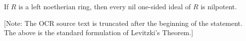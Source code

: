 If $R$ is a left noetherian ring, then every nil one-sided ideal of $R$ is nilpotent.

[Note: The OCR source text is truncated after the beginning of the statement. The above is the standard formulation of Levitzki's Theorem.]
